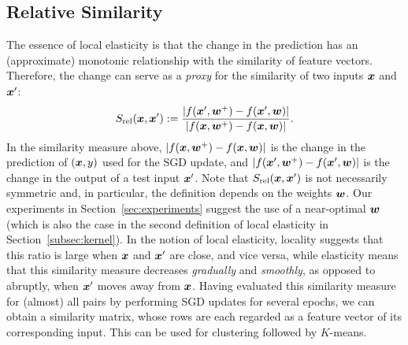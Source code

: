 

\subsection{Relative Similarity}\label{sec:relative-similarity}
The essence of local elasticity is that the change in the prediction has an (approximate) monotonic relationship with the similarity of feature vectors. Therefore, the change can serve as a \textit{proxy} for the similarity of two inputs $\bm{x}$ and $\bm{x}'$:
\begin{equation}\label{eq:sr}
S_{\mathrm{rel}}(\bm{x}, \bm{x}') := \frac{|f(\bm{x}', \bm{w}^+) - f(\bm{x}', \bm{w})|}{|f(\bm{x}, \bm{w}^+) - f(\bm{x},\bm{w})|}.
\end{equation}
In the similarity measure above, $|f(\bm{x}, \bm{w}^+) - f(\bm{x}, \bm{w})|$ is the change in the prediction of $(\bm{x}, y)$ used for the SGD update, and $|f(\bm{x}', \bm{w}^+) - f(\bm{x}', \bm{w})|$ is the change in the output of a test input $\bm{x}'$. Note that $S_{\mathrm{rel}}(\bm{x}, \bm{x}')$ is not necessarily symmetric and, in particular, the definition depends on the weights $\bm{w}$. Our experiments in Section~\ref{sec:experiments} suggest the use of a near-optimal $\bm{w}$ (which is also the case in the second definition of local elasticity in Section~\ref{subsec:kernel}). In the notion of local elasticity, locality suggests that this ratio is large when $\bm{x}$ and $\bm{x}'$ are close, and vice versa, while elasticity means that this similarity measure decreases \textit{gradually} and \textit{smoothly}, as opposed to abruptly, when $\bm{x}'$ moves away from $\bm{x}$. Having evaluated this similarity measure for (almost) all pairs by performing SGD updates for several epochs, we can obtain a similarity matrix, whose rows are each regarded as a feature vector of its corresponding input. This can be used for clustering followed by $K$-means. 

